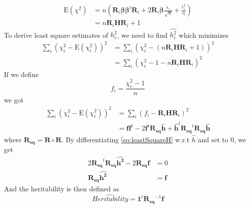 			\begin{align*}
			\mathrm{E}(\chi^2) &= n(\boldsymbol{R}_i\boldsymbol{\beta\beta}^t\boldsymbol{R}_i+2\boldsymbol{R}_i\boldsymbol{\beta}\frac{\epsilon_i}{\sqrt{n}}+\frac{\epsilon_i^2}{n}) \\
			&= n\boldsymbol{R}_i\boldsymbol{H}\boldsymbol{R}_i+1
			\end{align*}
			To derive least square estimates of $h_i^2$, we need to find $\hat{h_i^2}$ which minimizes
			\begin{align*}
				\sum_i(\chi_i^2-\mathrm{E}(\chi_i^2))^2&=\sum_i(\chi_i^2-(n\boldsymbol{R}_i\boldsymbol{H}\boldsymbol{R}_i+1))^2 \\
				&=\sum_i(\chi_i^2-1-n\boldsymbol{R}_i\boldsymbol{H}\boldsymbol{R}_i)^2 
			\end{align*}
			If we define 
			\begin{equation}
			f_i= \frac{\chi_i^2-1}{n}
			\label{eq:defineF}
			\end{equation}
			we got
			\begin{align}
			\sum_i(\chi_i^2-\mathrm{E}(\chi_i^2))^2&=\sum_i(f_i-\boldsymbol{R}_i\boldsymbol{H}\boldsymbol{R}_i)^2 \nonumber\\
			&=\boldsymbol{ff}^t-2\boldsymbol{f}^t\boldsymbol{R_{sq}\hat{h}}+\boldsymbol{\hat{h}}^t\boldsymbol{R_{sq}}^t\boldsymbol{R_{sq}\hat{h}}
			\label{eq:leastSquareH}
			\end{align}
			where $\boldsymbol{R_{sq}} = \boldsymbol{R}\circ\boldsymbol{R}$.
			By differentiating \cref{eq:leastSquareH} w.r.t $\hat{h}$ and set to 0, we get
			\begin{align}
				2\boldsymbol{R_{sq}}^t\boldsymbol{R_{sq}}\boldsymbol{\hat{h^2}}-2\boldsymbol{R_{sq}f}&=0 \nonumber\\
				\boldsymbol{R_{sq}}\boldsymbol{\hat{h^2}} &=\boldsymbol{f}
				\label{eq:shrekEq}
			\end{align}
			And the heritability is then defined as 
			\begin{equation}
			\hat{Heritability} = \boldsymbol{1}^t\boldsymbol{R_{sq}}^{-1}\boldsymbol{f}
			\label{eq:fullShrek}
			\end{equation}
